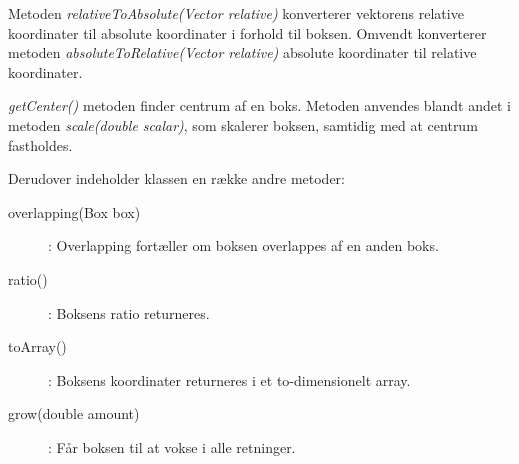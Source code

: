 Metoden \emph{relativeToAbsolute(Vector relative)} konverterer vektorens relative koordinater til absolute koordinater i forhold til boksen. Omvendt konverterer metoden \emph{absoluteToRelative(Vector relative)} absolute koordinater til relative koordinater.

\emph{getCenter()} metoden finder centrum af en boks. Metoden anvendes blandt andet i metoden \emph{scale(double scalar)}, som skalerer boksen, samtidig med at centrum fastholdes.

Derudover indeholder klassen en række andre metoder:

\begin{description}
	\item[overlapping(Box box)]: Overlapping fortæller om boksen overlappes af en anden boks.
	\item[ratio()]: Boksens ratio returneres.
	\item[toArray()]: Boksens koordinater returneres i et to-dimensionelt array.
	\item[grow(double amount)]: Får boksen til at vokse i alle retninger.
\end{description}